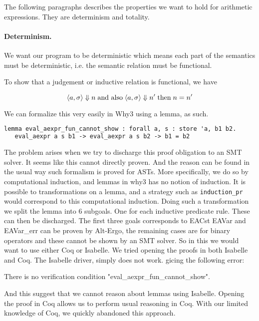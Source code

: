 The following paragraphs describes the properties we want to hold for arithmetic expressions. They are determinism and totality.

\paragraph{Determinism.}
We want our program to be deterministic which means each part of the semantics must be deterministic, i.e. the semantic relation must be functional.

To show that a judgement or inductive relation is functional, we have

\[
  \langle a,\sigma \rangle \Downarrow n \; \text{and also} \; \langle a,\sigma \rangle \Downarrow n' \; \text{then} \; n = n'
\]

We can formalize this very easily in Why3 using a lemma, as such.

\begin{lstlisting}[caption={lemma for functional arithmetic expressions},label={lst:why3funnorec},language=sml]
lemma eval_aexpr_fun_cannot_show : forall a, s : store 'a, b1 b2.
   eval_aexpr a s b1 -> eval_aexpr a s b2 -> b1 = b2
\end{lstlisting}

The problem arises when we try to discharge this proof obligation to an SMT solver. It seems like this cannot directly proven. And the reason can be found in the usual way such formalism is proved for ASTs.
More specifically, we do so by computational induction, and lemmas in why3 has no notion of induction.
It is possible to transformations on a lemma, and a strategy such as \texttt{induction_pr} would correspond
to this computational induction. Doing such a transformation we split the lemma into 6 subgoals.
One for each inductive predicate rule.
These can then be discharged. The first three goals corresponds to EACst EAVar and EAVar\_err can be proven by Alt-Ergo, the remaining cases are for binary operators and these cannot be shown by an SMT solver. So in this we would want to use either Coq or Isabelle. We tried opening the proofs in both Isabelle and Coq.
The Isabelle driver, simply does not work. gicing the following error:

There is no verification condition "eval_aexpr_fun_cannot_show".

And this suggest that we cannot reason about lemmas using Isabelle. Opening the proof in Coq allows us to
perform usual reasoning in Coq. With our limited knowledge of Coq, we quickly abandoned this approach.

